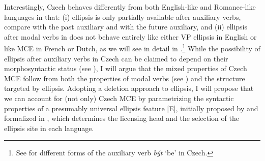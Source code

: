\documentclass[output=paper,colorlinks,citecolor=brown,
modfonts
]{langscibook}
\begin{document}
\noindent Interestingly, Czech behaves differently from both English-like and Romance-like languages in that: (i) ellipsis is only partially available after auxiliary verbs, compare  with the past auxiliary and  with the future auxiliary, and (ii) ellipsis after modal verbs in  does not behave entirely like either VP ellipsis in English or like MCE in French or Dutch, as we will see in detail in .\footnote{See  for different forms of the auxiliary verb \textit{být} `be' in Czech.} While the possibility of ellipsis after auxiliary verbs in Czech can be claimed to depend on their morphosyntactic status (see ), I will argue that the mixed properties of Czech MCE follow from both the properties of modal verbs (see  ) and the structure targeted by ellipsis. Adopting a deletion approach to ellipsis, I will propose that we can account for (not only) Czech MCE by parametrizing the syntactic properties of a presumably universal ellipsis feature [E], initially proposed by \cite{Lobeck1995} and formalized in \cite{Merchant2001}, which determines the licensing head and the selection of the ellipsis site in each language. 

\begin{exe}
\ex
\begin{xlist}
\end{xlist}
\end{exe}
\end{document}

